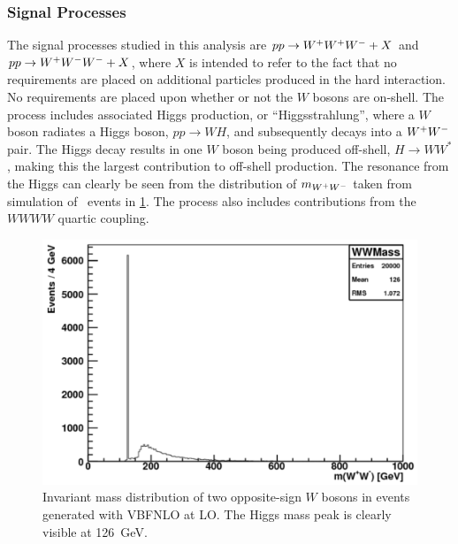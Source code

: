 \subsubsection{Signal Processes}
\label{sec:signal}
The signal processes studied in this analysis 
are  $pp\rightarrow\- W^{+}W^{+}W^{-}+X$ and $pp\rightarrow W^{+}W^{-}W^{-}\allowbreak +X$, 
where $X$ is intended to refer to the fact that
no requirements are placed on additional particles produced in the hard
interaction.
No requirements are placed upon whether or not the $W$ bosons are on-shell.
The process includes associated Higgs production, 
or ``Higgsstrahlung'', where a $W$ boson radiates a Higgs boson,
$pp\rightarrow WH$, and subsequently decays into a $W^{+}W^{-}$ pair.
The Higgs decay results in one $W$ boson being produced off-shell,
$H\rightarrow WW^*$, making this the largest contribution to off-shell
production.  The resonance from the Higgs can clearly be seen from the 
distribution of $m_{W^{+}W^{-}}$ taken from simulation of \www~events
in \fig\ref{fig:mww_higgs}.
The \www process also includes contributions from 
the $WWWW$ quartic coupling. %

\begin{figure}[ht]
\centering
\includegraphics[width=0.5\columnwidth]{figures/2l2j/mWW-parton.pdf}
\caption{ Invariant mass distribution of two opposite-sign $W$ bosons 
in \www events generated with VBFNLO at LO. The Higgs mass peak is clearly 
visible at 126~GeV.}
\label{fig:mww_higgs}
\end{figure}



